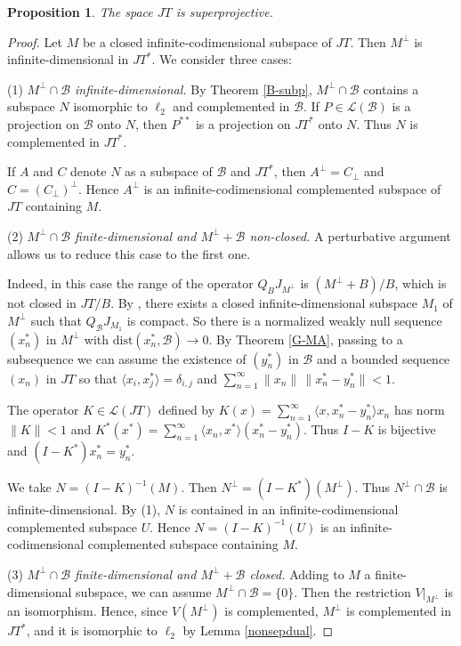 \documentclass[12pt]{amsart}
\theoremstyle{plain}
\numberwithin{equation}{section}
\newcommand{\la}{\langle}
\newcommand{\ra}{\rangle}
\newcommand{\B}{\mathcal{B}}
\newcommand{\Lc}{\mathcal{L}}
\newtheorem{proposition}[theorem]{Proposition}
\begin{document}
\begin{proposition}\label{JTsuper}
The space $JT$ is superprojective.
\end{proposition}
\begin{proof}
Let $M$ be a closed infinite-codimensional subspace of $JT$. Then $M^\perp$ is infinite-dimensional in $JT^*$. We consider three cases:
\smallskip

(1) \emph{$M^\perp\cap \B$ infinite-dimensional.} By Theorem \ref{B-subp}, $M^\perp\cap \B$ contains a subspace $N$ isomorphic to $\ell_2$ and complemented in $\B$. If $P\in\Lc(\B)$ is a projection on $\B$ onto $N$, then $P^{**}$ is a projection on $JT^*$ onto $N$. Thus $N$ is complemented in $JT^*$.

If $A$ and $C$ denote $N$ as a subspace of $\B$ and $JT^*$, then $A^\perp =C_\perp$ and $C= (C_\perp)^\perp$. Hence $A^\perp$ is an infinite-codimensional complemented subspace of $JT$ containing $M$.

(2) \emph{$M^\perp\cap \B$ finite-dimensional and $M^\perp +\B$ non-closed.} A perturbative argument allows us to reduce this case to the first one.

Indeed, in this case the range of the operator $Q_BJ_{M^\perp}$ is $(M^\perp+B)/B$, which is not closed in $JT/B$. By \cite[Proposition 2.c.4]{L-T:77},
there exists a closed infinite-dimensional subspace $M_1$ of $M^\perp$ such that $Q_\B J_{M_1}$ is compact.
So there is a normalized weakly null sequence $(x^*_n)$ in $M^\perp$ with $\textrm{dist}(x^*_n,\B)\to 0$. By Theorem \ref{G-MA}, passing to a subsequence
we can assume the existence of $(y^*_n)$ in $\B$ and a bounded sequence $(x_n)$ in $JT$ so that $\la x_i,x^*_j\ra= \delta_{i,j}$ and
$\sum_{n=1}^\infty \|x_n\|\, \|x^*_n- y^*_n\|<1$.

The operator $K\in\Lc(JT)$ defined by $K(x)= \sum_{n=1}^\infty \la x,x^*_n-y^*_n\ra x_n$ has norm $\|K\|<1$ and $K^*(x^*)= \sum_{n=1}^\infty \la x_n,x^*\ra(x^*_n-y^*_n)$. Thus $I-K$ is bijective and $(I-K^*)x^*_n= y^*_n$.

We take $N=(I-K)^{-1}(M)$. Then $N^\perp= (I-K^*)(M^\perp)$. Thus $N^\perp\cap \B$ is infinite-dimensional. By (1), $N$ is contained in an infinite-codimensional complemented subspace $U$. Hence $N=(I-K)^{-1}(U)$ is an infinite-codimensional complemented subspace containing $M$.
\smallskip

(3) \emph{$M^\perp\cap\B$ finite-dimensional and $M^\perp +\B$ closed.} Adding to $M$ a finite-dimensional subspace, we can assume $M^\perp\cap \B=\{0\}$. Then the restriction $V|_{M^\perp}$ is an isomorphism. Hence, since $V(M^\perp)$ is complemented, $M^\perp$ is complemented in $JT^*$, and it is isomorphic to $\ell_2$ by Lemma \ref{nonsepdual}.


\end{proof}
\end{document}
